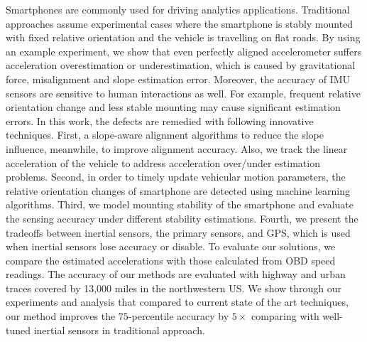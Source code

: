 


Smartphones are commonly used for driving analytics applications. 
Traditional approaches assume experimental
cases where the smartphone is stably mounted with fixed relative orientation
and the vehicle is travelling on flat roads. 
By using an example experiment, we show that 
even perfectly aligned accelerometer suffers acceleration overestimation or underestimation, 
which is caused by gravitational force, misalignment and slope estimation error.  
Moreover, the accuracy of IMU sensors are sensitive to human interactions
as well. 
For example, frequent relative orientation change and less stable mounting
may cause significant estimation errors. 
In this work, the defects are remedied
with following innovative techniques. 
First, a slope-aware alignment algorithms to reduce the slope influence, 
meanwhile, to improve alignment accuracy. Also, we track the linear 
acceleration of the vehicle to address acceleration over/under estimation problems. 
Second, in order to timely update 
vehicular motion parameters, the relative orientation changes of 
smartphone are detected using machine learning algorithms. 
Third, we model mounting stability of the smartphone and 
evaluate the sensing accuracy under different stability estimations.  
Fourth, we present the tradeoffs between inertial sensors, the primary sensors, 
and GPS, which is used when inertial sensors lose accuracy or disable. 
To evaluate our solutions, we compare the estimated 
accelerations with those calculated from OBD speed readings.  
The accuracy of our methods are evaluated with highway and urban traces
covered by 13,000 miles in the northwestern US.
We show through our experiments and analysis that
compared to current state of the art techniques, 
our method improves the $75$-percentile accuracy 
by $5\times$ comparing with well-tuned inertial sensors in traditional approach. 



